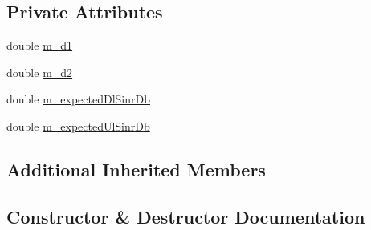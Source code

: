 \subsection*{Private Attributes}
\begin{DoxyCompactItemize}
\item 
double \hyperlink{classLteInterferenceHardFrTestCase_aac10d46115bab60e72e82449bedbf50b}{m\+\_\+d1}
\item 
double \hyperlink{classLteInterferenceHardFrTestCase_a9a04ae85ebadd45696a745d79970b8b4}{m\+\_\+d2}
\item 
double \hyperlink{classLteInterferenceHardFrTestCase_a4e66afcba8495ddb2ae4696dd905e25d}{m\+\_\+expected\+Dl\+Sinr\+Db}
\item 
double \hyperlink{classLteInterferenceHardFrTestCase_abf4dcef5568774271ffde6575eda141e}{m\+\_\+expected\+Ul\+Sinr\+Db}
\end{DoxyCompactItemize}
\subsection*{Additional Inherited Members}


\subsection{Constructor \& Destructor Documentation}
